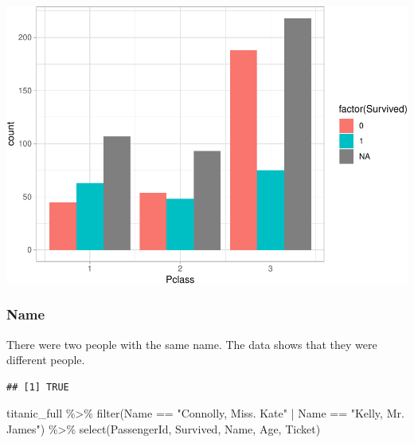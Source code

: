 \documentclass[
]{article}
\newenvironment{Shaded}{\begin{snugshade}}{\end{snugshade}}
\newcommand{\FunctionTok}[1]{\textcolor[rgb]{0.00,0.00,0.00}{#1}}
\newcommand{\NormalTok}[1]{#1}
\newcommand{\SpecialCharTok}[1]{\textcolor[rgb]{0.00,0.00,0.00}{#1}}
\newcommand{\StringTok}[1]{\textcolor[rgb]{0.31,0.60,0.02}{#1}}
\begin{document}
\includegraphics{final_pdf_files/figure-latex/unnamed-chunk-7-1.pdf}

\hypertarget{name}{%
\subsubsection{\texorpdfstring{\textbf{Name}}{Name}}\label{name}}

There were two people with the same name. The data shows that they were
different people.

\begin{Shaded}
\end{Shaded}

\begin{verbatim}
## [1] TRUE
\end{verbatim}

\begin{Shaded}
\begin{Highlighting}[]
\NormalTok{titanic\_full }\SpecialCharTok{\%\textgreater{}\%}
  \FunctionTok{filter}\NormalTok{(Name }\SpecialCharTok{==} \StringTok{"Connolly, Miss. Kate"} \SpecialCharTok{|}\NormalTok{ Name }\SpecialCharTok{==} \StringTok{"Kelly, Mr. James"}\NormalTok{) }\SpecialCharTok{\%\textgreater{}\%}
  \FunctionTok{select}\NormalTok{(PassengerId, Survived, Name, Age, Ticket)}
\end{Highlighting}
\end{Shaded}
\end{document}

